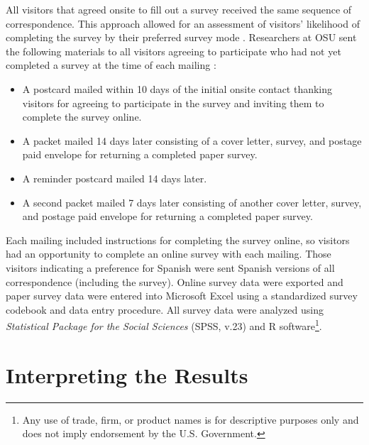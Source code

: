 \documentclass[]{book}
\providecommand{\tightlist}{%
  \setlength{\itemsep}{0pt}\setlength{\parskip}{0pt}}
\let\rmarkdownfootnote\footnote%
\def\footnote{\protect\rmarkdownfootnote}
\begin{document}
All visitors that agreed onsite to fill out a survey received the same
sequence of correspondence. This approach allowed for an assessment of
visitors' likelihood of completing the survey by their preferred survey
mode \citep{sexton2011}. Researchers at OSU sent the following materials
to all visitors agreeing to participate who had not yet completed a
survey at the time of each mailing \citep{dillman2014}:

\begin{itemize}
\tightlist
\item
  A postcard mailed within 10 days of the initial onsite contact
  thanking visitors for agreeing to participate in the survey and
  inviting them to complete the survey online.
\item
  A packet mailed 14 days later consisting of a cover letter, survey,
  and postage paid envelope for returning a completed paper survey.
\item
  A reminder postcard mailed 14 days later.
\item
  A second packet mailed 7 days later consisting of another cover
  letter, survey, and postage paid envelope for returning a completed
  paper survey.
\end{itemize}

Each mailing included instructions for completing the survey online, so
visitors had an opportunity to complete an online survey with each
mailing. Those visitors indicating a preference for Spanish were sent
Spanish versions of all correspondence (including the survey). Online
survey data were exported and paper survey data were entered into
Microsoft Excel using a standardized survey codebook and data entry
procedure. All survey data were analyzed using \emph{Statistical Package
for the Social Sciences} (SPSS, v.23) and R software\footnote{Any use of
  trade, firm, or product names is for descriptive purposes only and
  does not imply endorsement by the U.S. Government.}.

\section*{Interpreting the Results}\label{interpreting-the-results-1}
\end{document}
